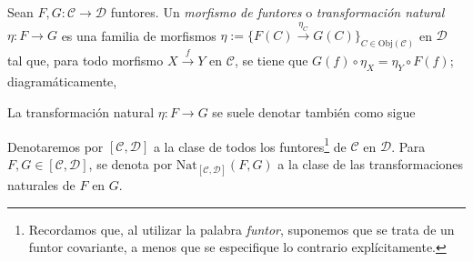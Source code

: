 \documentclass[tesis]{subfiles}
\begin{document}
\begin{Def}\label{Def: Transformación natural}
    Sean $F,G:\mathscr{C}\to \mathscr{D}$ funtores. Un \emph{morfismo de funtores} o \emph{transformación natural} $\eta:F\to G$ es una familia de morfismos $\eta:=\{F(C)\xrightarrow[]{\eta_C} G(C)\}_{C\in\text{Obj}(\mathscr{C})}$ en $\mathscr{D}$ tal que, para todo morfismo $X\xrightarrow[]{f} Y$ en $\mathscr{C}$, se tiene que $G(f)\circ\eta_X = \eta_Y\circ F(f)$; diagramáticamente,
    \begin{center}
    \end{center}
    La transformación natural $\eta:F\to G$ se suele denotar también como sigue
    \begin{center}
    \end{center}
    Denotaremos por $[\mathscr{C},\mathscr{D}]$ a la clase de todos los funtores\footnote{Recordamos que, al utilizar la palabra \emph{funtor}, suponemos que se trata de un funtor covariante, a menos que se especifique lo contrario explícitamente.} de $\mathscr{C}$ en $\mathscr{D}$. Para $F,G\in[\mathscr{C},\mathscr{D}]$, se denota por $\text{Nat}_{[\mathscr{C},\mathscr{D}]}(F,G)$ a la clase de las transformaciones naturales de $F$ en $G$.
\end{Def}
\end{document}

